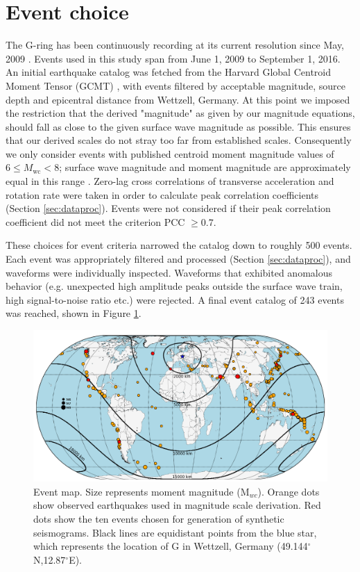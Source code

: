 \documentclass{gji}
\begin{document}
\section{Event choice}
The G-ring has been continuously recording at its current resolution since May, 2009 \cite{salvermoser2017event}. 
Events used in this study span from June 1, 2009 to September 1, 2016. An initial earthquake catalog was fetched from the Harvard Global Centroid Moment Tensor (GCMT) \cite{ekstrom2012global},
with events filtered by acceptable magnitude, source depth and epicentral distance from Wettzell, Germany. At this point we imposed the restriction that the derived 
"magnitude" as given by our magnitude equations, should fall as close to the given surface wave magnitude as possible. This ensures that our derived scales do not stray too far from established scales. Consequently we only consider events with published centroid moment magnitude values of $6 \le M_{\text{wc}} < 8$; surface wave magnitude and moment magnitude are approximately equal in this range \cite{shearer2009introduction}.
 Zero-lag cross correlations of transverse acceleration and rotation rate were taken in order to calculate peak correlation coefficients (Section \ref{sec:dataproc}). Events were not considered if their peak correlation coefficient did not meet the criterion PCC $\geq 0.7$. 

These choices for event criteria narrowed the catalog down to roughly 500 events. Each event was appropriately filtered and processed (Section \ref{sec:dataproc}), and waveforms were individually inspected. Waveforms that exhibited anomalous behavior (e.g. unexpected high amplitude peaks outside the surface wave train, high signal-to-noise ratio etc.) were rejected. A final event catalog of 243 events was reached, shown in Figure \ref{fig:event_map}.

\begin{figure}
\centerline{\includegraphics[width=.8\textwidth]{event_map}}
\caption{Event map. Size represents moment magnitude (M$_{wc}$). Orange dots show observed earthquakes used in magnitude scale derivation. Red dots show the ten events chosen for generation of synthetic seismograms. Black lines are equidistant points from the blue star, which represents the location of G in Wettzell, Germany (49.144$^\circ$N,12.87$^\circ$E).}
\label{fig:event_map}
\end{figure}
\end{document}
